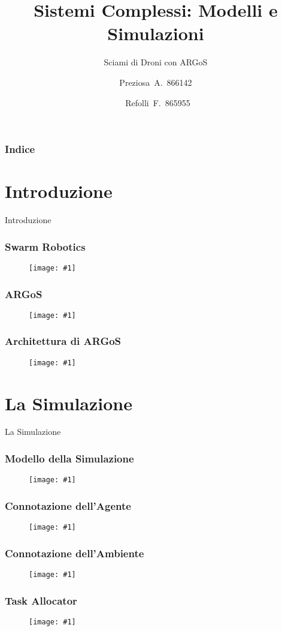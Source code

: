 \documentclass{beamer}
\title{Sistemi Complessi: Modelli e Simulazioni}
\subtitle{Sciami di Droni con ARGoS}
\author{Preziosa~A.~866142 \and ~Refolli~F.~865955}
\newcommand{\putimage}[2] {
  \begin{figure}[H]
    \centering
    \texttt{[image: \#1]}
	\end{figure}
}
\begin{document}
\frame{\titlepage}

\begin{frame}
\frametitle{Indice}
\tableofcontents
\end{frame}

\section{Introduzione}
\begin{frame}
\centering
\Huge
Introduzione
\end{frame}

\begin{frame}
\frametitle{Swarm Robotics}
  \putimage{images/swarm\_robotics.png}{0.99}
\end{frame}

\begin{frame}
\frametitle{ARGoS}
\putimage{images/argos3.png}{0.85}
\end{frame}

\begin{frame}
\frametitle{Architettura di ARGoS}
\putimage{images/architecture.png}{0.85}
\end{frame}

\section{La Simulazione}
\begin{frame}
\centering
\Huge
La Simulazione
\end{frame}

\begin{frame}
\frametitle{Modello della Simulazione}
\putimage{images/simulation-model.png}{0.99}
\end{frame}

\begin{frame}
\frametitle{Connotazione dell'Agente}
\putimage{images/agent.png}{0.99}
\end{frame}

\begin{frame}
\frametitle{Connotazione dell'Ambiente}
\putimage{images/environment.png}{0.99}
\end{frame}

\begin{frame}
\frametitle{Task Allocator}
\putimage{images/task-allocator.png}{0.70}
\end{frame}
\end{document}
